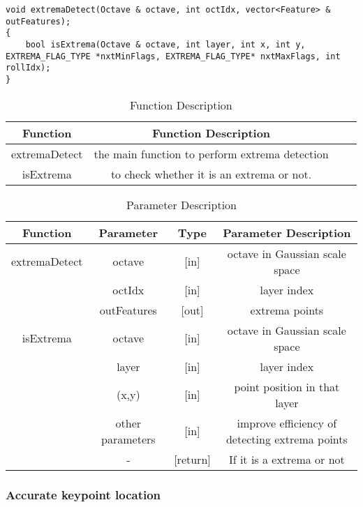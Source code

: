 \documentclass[paper=a4, fontsize=11pt]{scrartcl} %
\numberwithin{equation}{section} %
\numberwithin{figure}{section} %
\numberwithin{table}{section} %
\begin{document}
\begin{lstlisting}
void extremaDetect(Octave & octave, int octIdx, vector<Feature> & outFeatures);
{
    bool isExtrema(Octave & octave, int layer, int x, int y, EXTREMA_FLAG_TYPE *nxtMinFlags, EXTREMA_FLAG_TYPE* nxtMaxFlags, int rollIdx);
}
\end{lstlisting}

\begin{table}[h]
    \centering
    \begin{tabular}{|c|c| lp{}}
        \hline
        \textbf{Function} & \textbf{Function Description} \\\hline
          extremaDetect & the main function to perform extrema detection \\\hline
              isExtrema & to check whether it is an extrema or not. \\\hline
    \end{tabular}
    \caption{Function Description}\label{nolock}
\end{table}

\begin{table}[h]
    \centering
    \begin{tabular}{|c|c|c|c|}
        \hline
        \textbf{Function} & \textbf{Parameter} & \textbf{Type} & \textbf{Parameter Description} \\\hline
        extremaDetect & octave & [in] & octave in Gaussian scale space \\
                        & octIdx &[in] & layer index \\
                        & outFeatures &[out] & extrema points \\\hline
        isExtrema & octave & [in] & octave in Gaussian scale space \\
                  & layer & [in] & layer index \\
                  & (x,y) & [in] & point position in that layer \\
                  & other parameters & [in] & improve efficiency of detecting extrema points\\
                        & - &[return] & If it is a extrema or not \\\hline
    \end{tabular}
    \caption{Parameter Description}\label{nolock}
\end{table}

\subsubsection{Accurate keypoint location}
\end{document}
